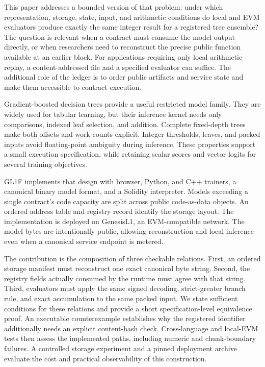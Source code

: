 \documentclass{ledger}
\begin{document}
This paper addresses a bounded version of that problem: under which
representation, storage, state, input, and arithmetic conditions do local and
EVM evaluators produce exactly the same integer result for a registered tree
ensemble? The question is relevant when a contract must consume the model
output directly, or when researchers need to reconstruct the precise public
function available at an earlier block. For applications requiring only local
arithmetic replay, a content-addressed file and a specified evaluator can
suffice. The additional role of the ledger is to order public artifacts and
service state and make them accessible to contract execution.

Gradient-boosted decision trees provide a useful restricted model family.
They are widely used for tabular learning,\cite{friedman2001,chen2016xgboost,ke2017lightgbm}
but their inference kernel needs only comparisons, indexed leaf selection,
and addition. Complete fixed-depth trees make both offsets and work counts
explicit. Integer thresholds, leaves, and packed inputs avoid floating-point
ambiguity during inference. These properties support a small execution
specification, while retaining scalar scores and vector logits for several
training objectives.

GL1F implements that design with browser, Python, and C++ trainers, a
canonical binary model format, and a Solidity interpreter. Models exceeding a
single contract's code capacity are split across public code-as-data objects.
An ordered address table and registry record identify the storage layout.
The implementation is deployed on GenesisL1, an EVM-compatible network. The
model bytes are intentionally public, allowing reconstruction and local
inference even when a canonical service endpoint is metered.

The contribution is the composition of three checkable relations. First, an
ordered storage manifest must reconstruct one exact canonical byte string.
Second, the registry fields actually consumed by the runtime must agree with
that string. Third, evaluators must apply the same signed decoding,
strict-greater branch rule, and exact accumulation to the same packed input.
We state sufficient conditions for these relations and provide a short
specification-level equivalence proof. An executable counterexample
establishes why the registered identifier additionally needs an explicit
content-hash check. Cross-language and local-EVM tests then assess the
implemented paths, including numeric and chunk-boundary failures. A
controlled storage experiment and a pinned deployment archive evaluate the
cost and practical observability of this construction.
\end{document}
